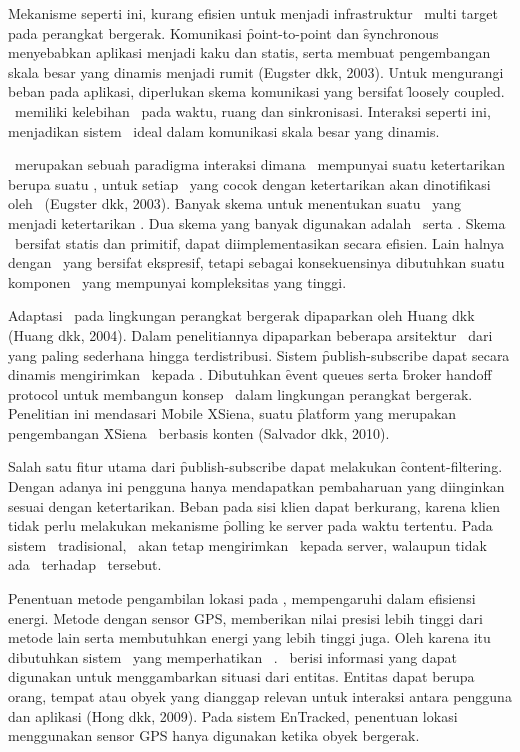 Mekanisme seperti ini, kurang efisien untuk menjadi infrastruktur
\tracking~multi target pada perangkat bergerak. Komunikasi \f{point-to-point}
dan \f{synchronous} menyebabkan aplikasi menjadi kaku dan statis, serta membuat
pengembangan skala besar yang dinamis menjadi rumit (Eugster dkk, 2003). Untuk
mengurangi beban pada aplikasi, diperlukan skema komunikasi yang bersifat
\f{loosely coupled}. \PubSub~memiliki kelebihan \decoupling~pada waktu, ruang
dan sinkronisasi. Interaksi seperti ini, menjadikan sistem \pubsub~ideal dalam
komunikasi skala besar yang dinamis.

\PubSub~merupakan sebuah paradigma interaksi dimana \subscriber~mempunyai suatu
ketertarikan berupa suatu \event, untuk setiap \event~yang cocok dengan
ketertarikan akan dinotifikasi oleh \publisher~(Eugster dkk, 2003). Banyak
skema untuk menentukan suatu \event~yang menjadi ketertarikan \subscriber. Dua
skema yang banyak digunakan adalah \topicbased~serta \contentbased. Skema
\topicbased~bersifat statis dan primitif, dapat diimplementasikan secara
efisien. Lain halnya dengan \contentbased~yang bersifat ekspresif, tetapi
sebagai konsekuensinya dibutuhkan suatu komponen \filtering~yang mempunyai
kompleksitas yang tinggi.

Adaptasi \pubsub~pada lingkungan perangkat bergerak dipaparkan oleh Huang dkk
(Huang dkk, 2004). Dalam penelitiannya dipaparkan beberapa arsitektur
\pubsub~dari yang paling sederhana hingga terdistribusi. Sistem
\f{publish-subscribe} dapat secara dinamis mengirimkan \event~kepada
\subscriber. Dibutuhkan \f{event queues} serta \f{broker handoff protocol} untuk
membangun konsep \pubsub~dalam lingkungan perangkat bergerak. Penelitian ini
mendasari \f{Mobile XSiena}, suatu \f{platform} yang merupakan pengembangan
\f{XSiena} \pubsub~berbasis konten (Salvador dkk, 2010).

Salah satu fitur utama dari \f{publish-subscribe} dapat melakukan
\f{content-filtering}. Dengan adanya ini pengguna hanya mendapatkan pembaharuan
yang diinginkan sesuai dengan ketertarikan. Beban pada sisi klien dapat
berkurang, karena klien tidak perlu melakukan mekanisme \f{polling} ke server
pada waktu tertentu. Pada sistem \pubsub~tradisional, \publisher~akan tetap
mengirimkan \event~kepada server, walaupun tidak ada \subscription~terhadap
\event~tersebut.

Penentuan metode pengambilan lokasi pada \tracking, mempengaruhi dalam efisiensi
energi.  Metode dengan sensor GPS, memberikan nilai presisi lebih tinggi dari
metode lain serta membutuhkan energi yang lebih tinggi juga. Oleh karena itu
dibutuhkan sistem \tracking~yang memperhatikan \context~\aware.  \Context~berisi
informasi yang dapat digunakan untuk menggambarkan situasi dari entitas. Entitas
dapat berupa orang, tempat atau obyek yang dianggap relevan untuk interaksi
antara pengguna dan aplikasi (Hong dkk, 2009).  Pada sistem EnTracked, penentuan
lokasi menggunakan sensor GPS hanya digunakan ketika obyek bergerak.

